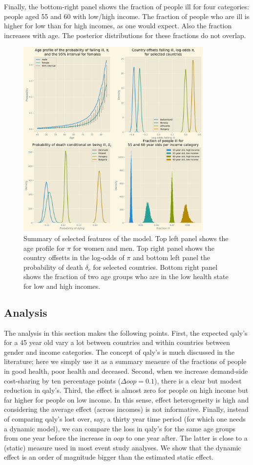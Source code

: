 \documentclass[a4paper,12pt]{article}
\begin{document}
Finally, the bottom-right panel shows the fraction of people ill for four categories: people aged 55 and 60 with low/high income. The fraction of people who are ill is higher for low than for high incomes, as one would expect. Also the fraction increases with age. The posterior distributions for these fractions do not overlap.

\begin{figure}[htbp]
\centering
\includegraphics[height=10cm]{./figures/summary_figure.png}
\caption{\label{fig:summary}Summary of selected features of the model. Top left panel shows the age profile for \(\pi\) for women and men. Top right panel shows the country offsetts in the log-odds of \(\pi\) and bottom left panel the probability of death \(\delta_c\) for selected countries. Bottom right panel shows the fraction of two age groups who are in the low health state for low and high incomes.}
\end{figure}
\subsection{Analysis}
\label{sec:orgf5bfb87}

The analysis in this section makes the following points. First, the expected qaly's for a 45 year old vary a lot between countries and within countries between gender and income categories. The concept of qaly's is much discussed in the literature; here we simply use it as a summary measure of the fractions of people in good health, poor health and deceased. Second, when we increase demand-side cost-sharing by ten percentage points (\(\Delta oop = 0.1\)), there is a clear but modest reduction in qaly's. Third, the effect is almost zero for people on high income but far higher for people on low income. In this sense, effect heterogeneity is high and considering the average effect (across incomes) is not informative. Finally, instead of comparing qaly's lost over, say, a thirty year time period (for which one needs a dynamic model), we can compare the loss in qaly's for the same age groups from one year before the increase in \(oop\) to one year after. The latter is close to a (static) measure used in most event study analyses. We show that the dynamic effect is an order of magnitude bigger than the estimated static effect.
\end{document}
